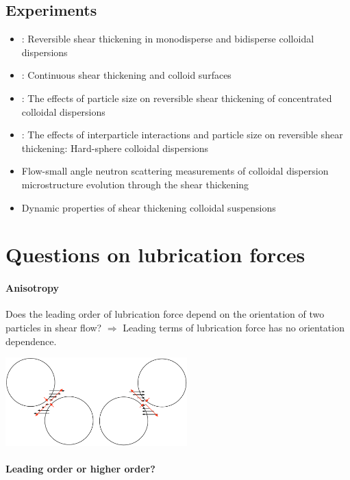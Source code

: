 \documentclass[12pt]{article}
\begin{document}
\subsection*{Experiments}

\begin{itemize}
 \item \citet{Bender_1996}:
Reversible shear thickening in monodisperse and bidisperse colloidal dispersions
 \item \citet{Melrose_1996}:
Continuous shear thickening and colloid surfaces
 \item \citet{Maranzano_2001}:
The effects of particle size on reversible shear thickening of concentrated colloidal dispersions
 \item \citet{Maranzano_2001a}:
The effects of interparticle interactions and particle size 
on reversible shear thickening: Hard-sphere colloidal dispersions
 \item \citet{Maranzano_2002}
Flow-small angle neutron scattering measurements 
of colloidal dispersion microstructure evolution through the shear thickening 
 \item \cite{Lee_2003}
Dynamic properties of shear thickening colloidal suspensions

 \end{itemize}

\section{Questions on lubrication forces}

\paragraph{Anisotropy}
Does the leading order of lubrication force depend 
on the orientation of two particles in shear flow?
%
$\Longrightarrow$ 
Leading terms of lubrication force
has no orientation dependence.
%
\begin{center}
\includegraphics[width=7cm]{Lub_orientation_dependence.pdf} 
\end{center}

\paragraph{Leading order or higher order?}
\end{document}
